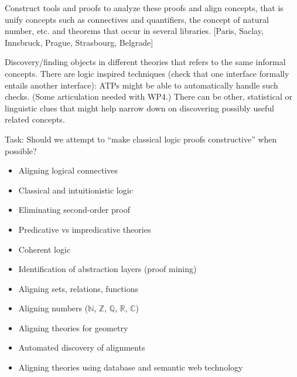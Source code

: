 \begin{workpackage}[id=alignment,wphases=0-48,type=RTD,
  short=Concept Alignment,%
  title=Concept Alignment,
  lead=Pra,
  BolRM=14, %
  PraRM=10]
\begin{wpdescription}
  Construct tools and proofs to analyze these proofs and align
  concepts, that is unify concepts such as connectives and
  quantifiers, the concept of natural number, etc. and theorems that
  occur in several libraries.  [Paris, Saclay, Innsbruck, Prague,
  Strasbourg, Belgrade]

  Discovery/finding objects in different theories that refers to the
  same informal concepts.  There are logic inspired techniques (check
  that one interface formally entails another interface): ATPs might
  be able to automatically handle such checks. (Some articulation
  needed with WP4.)  There can be other, statistical or linguistic
  clues that might help narrow down on discovering possibly useful
  related concepts.

\end{wpdescription}

Task: Should we attempt to ``make classical logic proofs
constructive'' when possible?

\begin{tasklist}
  \begin{task}[id=alignlogic,title=Alignment of logical foundations,lead=Lee]
    \begin{itemize}
    \item Aligning logical connectives
    \item Classical and intuitionistic logic
    \item Eliminating second-order proof
    \item Predicative vs impredicative theories
    \item Coherent logic
    \item Identification of abstraction layers (proof mining)
    \end{itemize}
  \end{task}
  
  \begin{task}[id=aligncasestudies,title=Case studies,lead=Str]
    \begin{itemize}
    \item Aligning sets, relations, functions
    \item Aligning numbers ($\mathbb{N}$, $\mathbb{Z}$, $\mathbb{Q}$,
      $\mathbb{R}$, $\mathbb{C}$)
    \item Aligning theories for geometry
    \end{itemize}
  \end{task}

  \begin{task}[id=aligntheories,title=Automated theory alignment,lead=Inr]
    \begin{itemize}
    \item Automated discovery of alignments
    \item Aligning theories using database and semantic web technology
    \end{itemize}
  \end{task}


\end{tasklist}
\end{workpackage}

